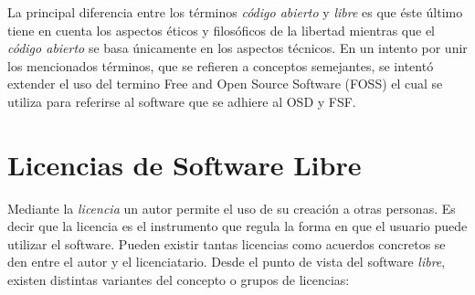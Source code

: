 La principal diferencia entre los términos \textit{código abierto} y
\textit{libre} es que éste último tiene en cuenta los aspectos éticos
y filosóficos de la libertad mientras que el \textit{código abierto}
se basa únicamente en los aspectos técnicos. En un intento por unir
los mencionados términos, que se refieren a conceptos semejantes, se
intentó extender el uso del termino Free and Open Source Software
(FOSS) el cual se utiliza para referirse al software que se adhiere al
OSD y FSF.


\section{Licencias de Software Libre}

Mediante la \textit{licencia} un autor permite el uso de su creación a
otras personas. Es decir que la licencia es el instrumento que regula
la forma en que el usuario puede utilizar el software. Pueden existir
tantas licencias como acuerdos concretos se den entre el autor y el
licenciatario. Desde el punto de vista del software \textit{libre},
existen distintas variantes del concepto o grupos de licencias:

